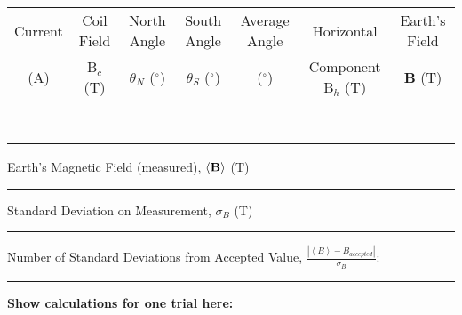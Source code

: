 \vspace{0.3cm}
\begin{tabular}{|c|c|c|c|c|c|c|}
\hline 
Current  &
Coil Field &
North Angle &
South Angle &
Average Angle &
Horizontal &
Earth's Field \\
(A)&
B\( _{c} \) (T)&
\( \theta  \)\( _{N} \) (\( ^{\circ } \))&
\( \theta  \)\( _{S} \) (\( ^{\circ } \))&
(\( ^{\circ } \))&
Component B\( _{h} \) (T)&
\textbf{B} (T)\\
\hline 
& & & & & &\\
\hline 
& & & & & &\\
\hline 
& & & & & &\\
\hline 
& & & & & &\\
\hline 
& & & & & &\\
\hline 
& & & & & &\\
\hline 
& & & & & &\\
\hline 
& & & & & &\\
\hline
\end{tabular}
\vspace{0.3cm}

\vspace{15mm}
Earth's Magnetic Field (measured), $\left\langle {\bf B} \right\rangle$ (T) \rule{2cm}{.1pt}

Standard Deviation on Measurement, \( \sigma _{B} \) (T) \rule{2cm}{.1pt}

Number of Standard Deviations from Accepted Value, $\displaystyle \frac{\left| \left\langle B \right\rangle - B_{accepted}\right| }{\sigma _{B}}$:
\rule{2cm}{.1pt} 

\textbf{Show calculations for one trial here:}
